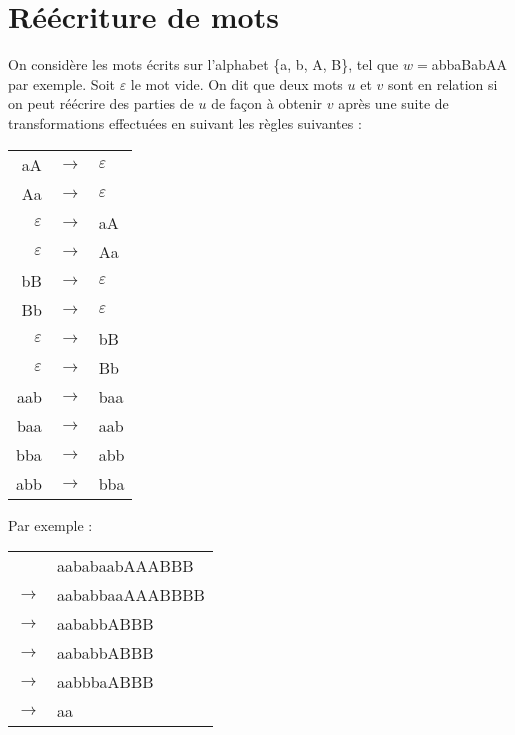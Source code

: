 \renewcommand{\SourceFile}{2-jouer-avec-les-mots/src/2-1.ml}

\section{Réécriture de mots}

On considère les mots écrits sur l'alphabet \{a, b, A, B\}, tel que $w=$abbaBabAA par exemple. Soit $\varepsilon$ le mot vide. On dit que deux mots $u$ et $v$ sont en relation si on peut réécrire des parties de $u$ de façon à obtenir $v$ après une suite de transformations effectuées en suivant les règles suivantes :

\begin{center}
    \begin{tabular}{ r c l }
        aA & $\rightarrow$ & $\varepsilon$ \\
        Aa & $\rightarrow$ & $\varepsilon$ \\
        $\varepsilon$ & $\rightarrow$ & aA \\
        $\varepsilon$ & $\rightarrow$ & Aa \\
        bB & $\rightarrow$ & $\varepsilon$ \\
        Bb & $\rightarrow$ & $\varepsilon$ \\
        $\varepsilon$ & $\rightarrow$ & bB \\
        $\varepsilon$ & $\rightarrow$ & Bb \\
        aab & $\rightarrow$ & baa \\
        baa & $\rightarrow$ & aab \\
        bba & $\rightarrow$ & abb \\
        abb & $\rightarrow$ & bba \\
    \end{tabular}
\end{center}

Par exemple :
\begin{center}
    \begin{tabular}{ r l }
         & aababaabAAABBB \\
        $\rightarrow$ & aababbaaAAABBBB \\
        $\rightarrow$ & aababbABBB \\
        $\rightarrow$ & aababbABBB \\
        $\rightarrow$ & aabbbaABBB \\
        $\rightarrow$ & aa \\
    \end{tabular}
\end{center}

